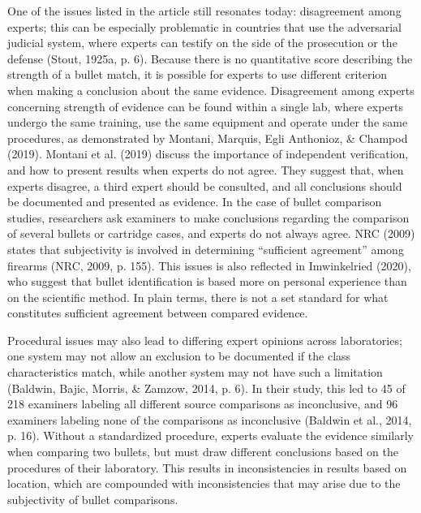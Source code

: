\documentclass[print]{nuthesis}
\begin{document}
One of the issues listed in the article still resonates today: disagreement among experts; this can be especially problematic in countries that use the adversarial judicial system, where experts can testify on the side of the prosecution or the defense (Stout, 1925a, p. 6).
Because there is no quantitative score describing the strength of a bullet match, it is possible for experts to use different criterion when making a conclusion about the same evidence.
Disagreement among experts concerning strength of evidence can be found within a single lab, where experts undergo the same training, use the same equipment and operate under the same procedures, as demonstrated by Montani, Marquis, Egli Anthonioz, \& Champod (2019).
Montani et al. (2019) discuss the importance of independent verification, and how to present results when experts do not agree.
They suggest that, when experts disagree, a third expert should be consulted, and all conclusions should be documented and presented as evidence.
In the case of bullet comparison studies, researchers ask examiners to make conclusions regarding the comparison of several bullets or cartridge cases, and experts do not always agree.
NRC (2009) states that subjectivity is involved in determining ``sufficient agreement'' among firearms (NRC, 2009, p. 155).
This issues is also reflected in Imwinkelried (2020), who suggest that bullet identification is based more on personal experience than on the scientific method.
In plain terms, there is not a set standard for what constitutes sufficient agreement between compared evidence.

Procedural issues may also lead to differing expert opinions across laboratories; one system may not allow an exclusion to be documented if the class characteristics match, while another system may not have such a limitation (Baldwin, Bajic, Morris, \& Zamzow, 2014, p. 6).
In their study, this led to 45 of 218 examiners labeling all different source comparisons as inconclusive, and 96 examiners labeling none of the comparisons as inconclusive (Baldwin et al., 2014, p. 16).
Without a standardized procedure, experts  evaluate the evidence similarly when comparing two bullets, but must draw different conclusions based on the procedures of their laboratory.
This results in inconsistencies in results based on location, which are compounded with inconsistencies that may arise due to the subjectivity of bullet comparisons.
\end{document}
